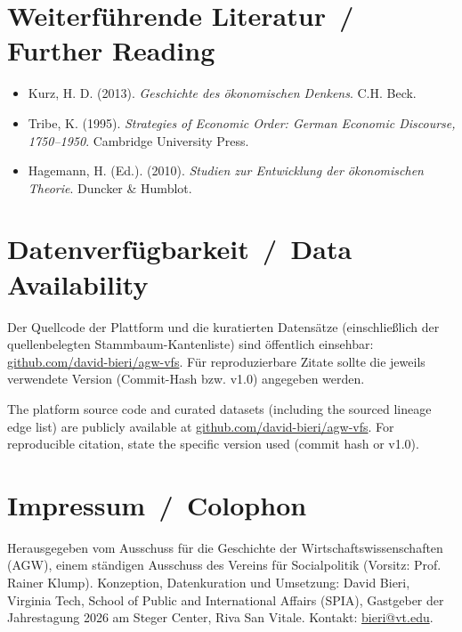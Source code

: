 \documentclass[11pt,a4paper,twoside]{article}
\newcommand{\guideversion}{v1.0}
\begin{document}
\section*{Weiterführende Literatur \,/\, Further Reading}
\begin{itemize}[leftmargin=*,itemsep=2pt,topsep=2pt]
    \item Kurz, H. D. (2013). \textit{Geschichte des ökonomischen Denkens}. C.H. Beck.
    \item Tribe, K. (1995). \textit{Strategies of Economic Order: German Economic Discourse, 1750--1950}. Cambridge University Press.
    \item Hagemann, H. (Ed.). (2010). \textit{Studien zur Entwicklung der ökonomischen Theorie}. Duncker \& Humblot.
\end{itemize}

\section{Datenverfügbarkeit \,/\, Data Availability}
Der Quellcode der Plattform und die kuratierten Datensätze (einschließlich der quellenbelegten Stammbaum-Kantenliste) sind öffentlich einsehbar: \href{https://github.com/david-bieri/agw-vfs}{github.com/david-bieri/agw-vfs}. Für reproduzierbare Zitate sollte die jeweils verwendete Version (Commit-Hash bzw. \guideversion) angegeben werden.

\noindent The platform source code and curated datasets (including the sourced lineage edge list) are publicly available at \href{https://github.com/david-bieri/agw-vfs}{github.com/david-bieri/agw-vfs}. For reproducible citation, state the specific version used (commit hash or \guideversion).

\section*{Impressum \,/\, Colophon}
Herausgegeben vom Ausschuss für die Geschichte der Wirtschaftswissenschaften (AGW), einem ständigen Ausschuss des Vereins für Socialpolitik (Vorsitz: Prof. Rainer Klump). Konzeption, Datenkuration und Umsetzung: David Bieri, Virginia Tech, School of Public and International Affairs (SPIA), Gastgeber der Jahrestagung 2026 am Steger Center, Riva San Vitale. Kontakt: \href{mailto:bieri@vt.edu}{bieri@vt.edu}.
\end{document}
